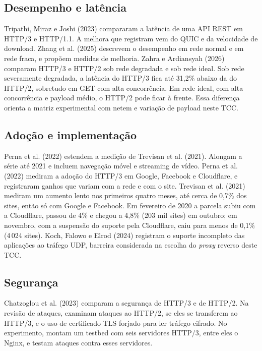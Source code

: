 \subsection{Desempenho e latência}

\begin{sloppypar}
Tripathi, Miraz e Joshi (2023) compararam a latência de uma API REST em HTTP/3 e HTTP/1.1. A melhora que registram vem do QUIC e da velocidade de download. Zhang et al. (2025) descrevem o desempenho em rede normal e em rede fraca, e propõem medidas de melhoria. Zahra e Ardiansyah (2026) comparam HTTP/3 e HTTP/2 sob rede degradada e sob rede ideal. Sob rede severamente degradada, a latência do HTTP/3 fica até 31,2\% abaixo da do HTTP/2, sobretudo em GET com alta concorrência. Em rede ideal, com alta concorrência e payload médio, o HTTP/2 pode ficar à frente. Essa diferença orienta a matriz experimental com netem e variação de payload neste TCC.
\end{sloppypar}

\subsection{Adoção e implementação}

Perna et al. (2022) estendem a medição de Trevisan et al. (2021). Alongam a série até 2021 e incluem navegação móvel e streaming de vídeo. Perna et al. (2022) mediram a adoção do HTTP/3 em Google, Facebook e Cloudflare, e registraram ganhos que variam com a rede e com o site. Trevisan et al. (2021) mediram um aumento lento nos primeiros quatro meses, até cerca de 0,7\% dos sites, então só com Google e Facebook. Em fevereiro de 2020 a parcela subiu com a Cloudflare, passou de 4\% e chegou a 4,8\% (203 mil sites) em outubro; em novembro, com a suspensão do suporte pela Cloudflare, caiu para menos de 0,1\% (4\,024 sites). Koch, Falowo e Elrod (2024) registram o suporte incompleto das aplicações ao tráfego UDP, barreira considerada na escolha do \textit{proxy} reverso deste TCC.

\subsection{Segurança}

Chatzoglou et al. (2023) comparam a segurança de HTTP/3 e de HTTP/2. Na revisão de ataques, examinam ataques ao HTTP/2, se eles se transferem ao HTTP/3, e o uso de certificado TLS forjado para ler tráfego cifrado. No experimento, montam um testbed com seis servidores HTTP/3, entre eles o Nginx, e testam ataques contra esses servidores.

